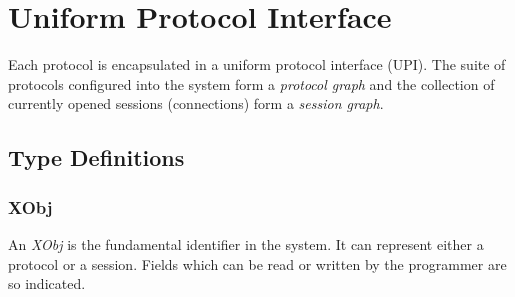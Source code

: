 % 
%
%
%
%
%


\section{Uniform Protocol Interface}

Each \xk{} protocol is encapsulated in a uniform protocol interface (UPI).
The suite of protocols configured into the system form a {\em protocol
graph} and the collection of currently opened sessions (connections)
form a {\em session graph}.

\subsection{Type Definitions}

\subsubsection{XObj}

An {\em XObj} is the fundamental identifier in the system.  It can
represent either a protocol or a session.  Fields which can be read or
written by the programmer are so indicated.

